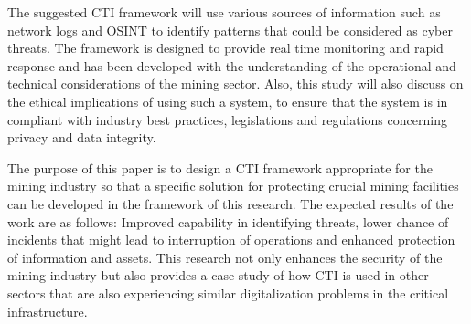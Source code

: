 \documentclass[a4paper,twoside,12pt]{report}
\begin{document}
The suggested CTI framework will use various sources of information such as network logs and OSINT to identify patterns that could be considered as cyber threats. The framework is designed to provide real time monitoring and rapid response and has been developed with the understanding of the operational and technical considerations of the mining sector. Also, this study will also discuss on the ethical implications of using such a system, to ensure that the system is in compliant with industry best practices, legislations and regulations concerning privacy and data integrity.

The purpose of this paper is to design a CTI framework appropriate for the mining industry so that a specific solution for protecting crucial mining facilities can be developed in the framework of this research. The expected results of the work are as follows: Improved capability in identifying threats, lower chance of incidents that might lead to interruption of operations and enhanced protection of information and assets. This research not only enhances the security of the mining industry but also provides a case study of how CTI is used in other sectors that are also experiencing similar digitalization problems in the critical infrastructure.

\end{document}
